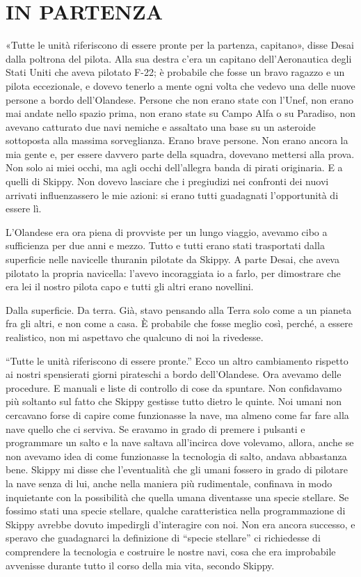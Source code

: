 \chapter{IN PARTENZA}\label{in-partenza}

\hfill\break

«Tutte le unità riferiscono di essere pronte per la partenza, capitano»,
disse Desai dalla poltrona del pilota. Alla sua destra c'era un capitano
dell'Aeronautica degli Stati Uniti che aveva pilotato F-22; è probabile
che fosse un bravo ragazzo e un pilota eccezionale, e dovevo tenerlo a
mente ogni volta che vedevo una delle nuove persone a bordo
dell'Olandese. Persone che non erano state con l'Unef, non erano mai
andate nello spazio prima, non erano state su Campo Alfa o su Paradiso,
non avevano catturato due navi nemiche e assaltato una base su un
asteroide sottoposta alla massima sorveglianza. Erano brave persone. Non
erano ancora la mia gente e, per essere davvero parte della squadra,
dovevano mettersi alla prova. Non solo ai miei occhi, ma agli occhi
dell'allegra banda di pirati originaria. E a quelli di Skippy. Non
dovevo lasciare che i pregiudizi nei confronti dei nuovi arrivati
influenzassero le mie azioni: si erano tutti guadagnati l'opportunità di
essere lì.

L'Olandese era ora piena di provviste per un lungo viaggio, avevamo cibo
a sufficienza per due anni e mezzo. Tutto e tutti erano stati
trasportati dalla superficie nelle navicelle thuranin pilotate da
Skippy. A parte Desai, che aveva pilotato la propria navicella: l'avevo
incoraggiata io a farlo, per dimostrare che era lei il nostro pilota
capo e tutti gli altri erano novellini.

Dalla superficie. Da terra. Già, stavo pensando alla Terra solo come a
un pianeta fra gli altri, e non come a casa. È probabile che fosse
meglio così, perché, a essere realistico, non mi aspettavo che qualcuno
di noi la rivedesse.

``Tutte le unità riferiscono di essere pronte.'' Ecco un altro
cambiamento rispetto ai nostri spensierati giorni pirateschi a bordo
dell'Olandese. Ora avevamo delle procedure. E manuali e liste di
controllo di cose da spuntare. Non confidavamo più soltanto sul fatto
che Skippy gestisse tutto dietro le quinte. Noi umani non cercavano
forse di capire come funzionasse la nave, ma almeno come far fare alla
nave quello che ci serviva. Se eravamo in grado di premere i pulsanti e
programmare un salto e la nave saltava all'incirca dove volevamo,
allora, anche se non avevamo idea di come funzionasse la tecnologia di
salto, andava abbastanza bene. Skippy mi disse che l'eventualità che gli
umani fossero in grado di pilotare la nave senza di lui, anche nella
maniera più rudimentale, confinava in modo inquietante con la
possibilità che quella umana diventasse una specie stellare. Se fossimo
stati una specie stellare, qualche caratteristica nella programmazione
di Skippy avrebbe dovuto impedirgli d'interagire con noi. Non era ancora
successo, e speravo che guadagnarci la definizione di ``specie
stellare'' ci richiedesse di comprendere la tecnologia e costruire le
nostre navi, cosa che era improbabile avvenisse durante tutto il corso
della mia vita, secondo Skippy.

